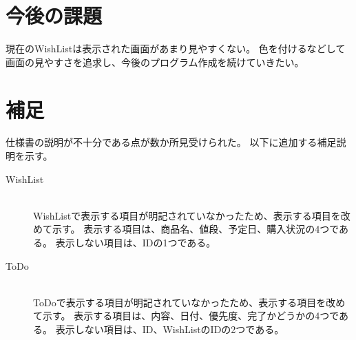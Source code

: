 ﻿\documentclass[a4j]{jarticle}
\begin{document}
\section{今後の課題}
現在のWishListは表示された画面があまり見やすくない。
色を付けるなどして画面の見やすさを追求し、今後のプログラム作成を続けていきたい。

\section{補足}
仕様書の説明が不十分である点が数か所見受けられた。
以下に追加する補足説明を示す。
\begin{description}
	\item[WishList] \mbox{} \\
		WishListで表示する項目が明記されていなかったため、表示する項目を改めて示す。
		表示する項目は、商品名、値段、予定日、購入状況の4つである。
		表示しない項目は、IDの1つである。
	\item[ToDo] \mbox{} \\
		ToDoで表示する項目が明記されていなかったため、表示する項目を改めて示す。
		表示する項目は、内容、日付、優先度、完了かどうかの4つである。
		表示しない項目は、ID、WishListのIDの2つである。
\end{description}
\end{document}
